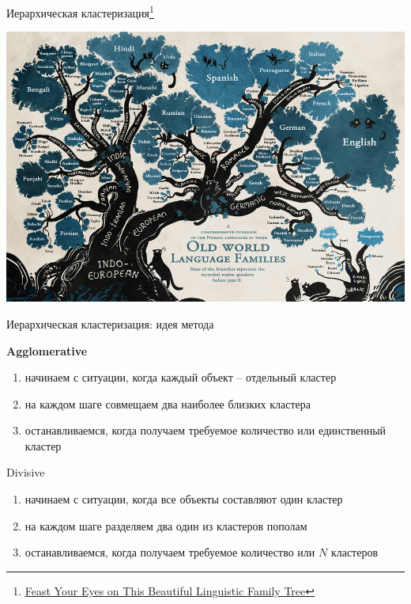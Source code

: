 \documentclass[aspectratio=169]{beamer}
\begin{document}

\begin{frame}

\begin{center}
{\Large Иерархическая кластеризация\footnote{\href{http://mentalfloss.com/article/59665/feast-your-eyes-beautiful-linguistic-family-tree}{Feast Your Eyes on This Beautiful Linguistic Family Tree}}}

\vspace{1em}
\includegraphics[width=0.95\textheight]{images/languages.png}
\end{center}

\end{frame}

\begin{frame}{Иерархическая кластеризация: идея метода}

{\bf Agglomerative}
\begin{enumerate}
\item начинаем с ситуации, когда каждый объект -- отдельный кластер
\item на каждом шаге совмещаем два наиболее близких кластера
\item останавливаемся, когда получаем требуемое количество или единственный кластер
\end{enumerate}

\vspace{1em}
Divisive
\begin{enumerate}
\item начинаем с ситуации, когда все объекты составляют один кластер
\item на каждом шаге разделяем два один из кластеров пополам
\item останавливаемся, когда получаем требуемое количество или $N$ кластеров
\end{enumerate}

\end{frame}
\end{document}
